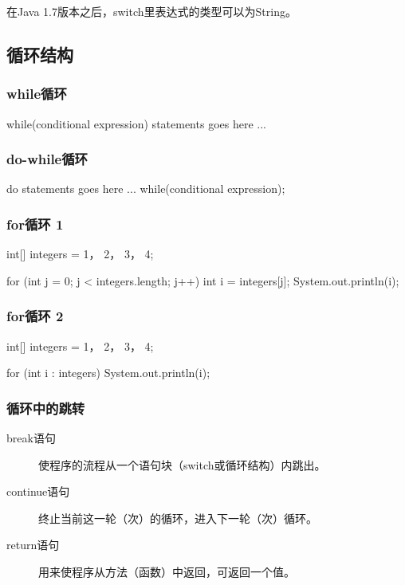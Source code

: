 
在Java 1.7版本之后，switch里表达式的类型可以为String。

\subsection{循环结构}

\subsubsection{while循环}

\begin{javaCode}
  while(conditional expression) {
    statements goes here ...
  }
\end{javaCode}

\subsubsection{do-while循环}

\begin{javaCode}
  do {
    statements goes here ...
  }
  while(conditional expression);
\end{javaCode}

\subsubsection{for循环 1}

\begin{javaCode}
  int[] integers = {1， 2， 3， 4};
  
  for (int j = 0; j < integers.length; j++) {
    int i = integers[j];
    System.out.println(i);
  } 
\end{javaCode}

\subsubsection{for循环 2}

\begin{javaCode}
  int[] integers = {1， 2， 3， 4};

  for (int i : integers) {
    System.out.println(i);
  }
\end{javaCode}


\subsubsection{循环中的跳转}

\begin{description}
\item[break语句] 使程序的流程从一个语句块（switch或循环结构）内跳出。
\item[continue语句] 终止当前这一轮（次）的循环，进入下一轮（次）循环。
\item[return语句] 用来使程序从方法（函数）中返回，可返回一个值。
\end{description}


